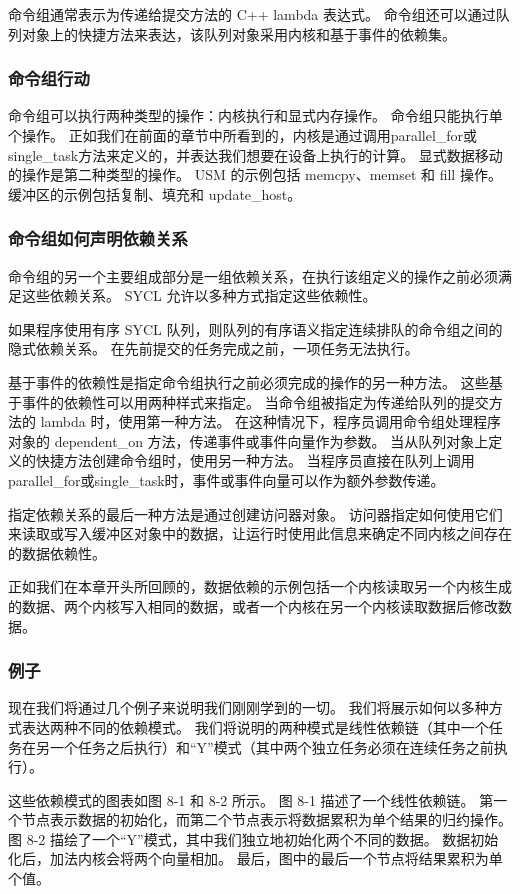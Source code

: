 命令组通常表示为传递给提交方法的 C++ lambda 表达式。 命令组还可以通过队列对象上的快捷方法来表达，该队列对象采用内核和基于事件的依赖集。

\subsubsection{命令组行动}
命令组可以执行两种类型的操作：内核执行和显式内存操作。 命令组只能执行单个操作。 正如我们在前面的章节中所看到的，内核是通过调用parallel\_for或single\_task方法来定义的，并表达我们想要在设备上执行的计算。 显式数据移动的操作是第二种类型的操作。 USM 的示例包括 memcpy、memset 和 fill 操作。 缓冲区的示例包括复制、填充和 update\_host。

\subsubsection{命令组如何声明依赖关系}
命令组的另一个主要组成部分是一组依赖关系，在执行该组定义的操作之前必须满足这些依赖关系。 SYCL 允许以多种方式指定这些依赖性。

如果程序使用有序 SYCL 队列，则队列的有序语义指定连续排队的命令组之间的隐式依赖关系。 在先前提交的任务完成之前，一项任务无法执行。

基于事件的依赖性是指定命令组执行之前必须完成的操作的另一种方法。 这些基于事件的依赖性可以用两种样式来指定。 当命令组被指定为传递给队列的提交方法的 lambda 时，使用第一种方法。 在这种情况下，程序员调用命令组处理程序对象的 dependent\_on 方法，传递事件或事件向量作为参数。 当从队列对象上定义的快捷方法创建命令组时，使用另一种方法。 当程序员直接在队列上调用parallel\_for或single\_task时，事件或事件向量可以作为额外参数传递。

指定依赖关系的最后一种方法是通过创建访问器对象。 访问器指定如何使用它们来读取或写入缓冲区对象中的数据，让运行时使用此信息来确定不同内核之间存在的数据依赖性。

正如我们在本章开头所回顾的，数据依赖的示例包括一个内核读取另一个内核生成的数据、两个内核写入相同的数据，或者一个内核在另一个内核读取数据后修改数据。

\subsubsection{例子}
现在我们将通过几个例子来说明我们刚刚学到的一切。 我们将展示如何以多种方式表达两种不同的依赖模式。 我们将说明的两种模式是线性依赖链（其中一个任务在另一个任务之后执行）和“Y”模式（其中两个独立任务必须在连续任务之前执行）。

这些依赖模式的图表如图 8-1 和 8-2 所示。 图 8-1 描述了一个线性依赖链。 第一个节点表示数据的初始化，而第二个节点表示将数据累积为单个结果的归约操作。 图 8-2 描绘了一个“Y”模式，其中我们独立地初始化两个不同的数据。 数据初始化后，加法内核会将两个向量相加。 最后，图中的最后一个节点将结果累积为单个值。

